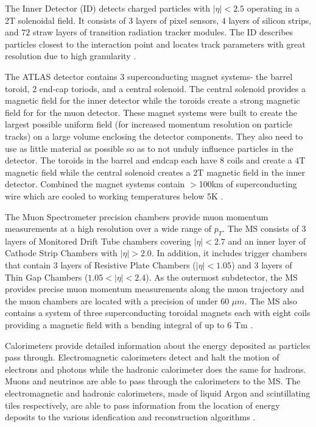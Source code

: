 The Inner Detector (ID) detects charged particles with $|\eta| < 2.5$ operating in a 2T solenoidal field. It consists of $3$ layers of pixel sensors, $4$ layers of silicon strips, and $72$ straw layers of transition radiation tracker modules. The ID describes particles closest to the interaction point and locates track parameters with great resolution due to high granularity \cite{detector}. 

The ATLAS detector contains 3 superconducting magnet systems- the barrel toroid, 2 end-cap toriods, and a central solenoid. The central solenoid provides a magnetic field for the inner detector while the toroids create a strong magnetic field for for the muon detector. These magnet systems were built to create the largest possible uniform field (for increased momentum resolution on particle tracks) on a large volume enclosing the detector components. They also need to use as little material as possible so as to not unduly influence particles in the detector. The toroids in the barrel and endcap each have 8 coils and create a 4T magnetic field while the central solenoid creates a 2T magnetic field in the inner detector. Combined the magnet systems contain $>$100km of superconducting wire which are cooled to working temperatures below 5K \cite{detector}. 

The Muon Spectrometer precision chambers provide muon momentum measurements at a high resolution over a wide range of $p_T$. The MS consists of $3$ layers of Monitored Drift Tube chambers covering $|\eta| < 2.7$ and an inner layer of Cathode Strip Chambers with $|\eta| > 2.0$. In addition, it includes trigger chambers that contain $3$ layers of Resistive Plate Chambers ($|\eta| < 1.05$) and $3$ layers of Thin Gap Chambers ($1.05 < |\eta| < 2.4$). As the outermost subdetector, the MS provides precise muon momentum measurements along the muon trajectory and the muon chambers are located with a precision of under $60$ $\mu m$. The MS also contains a system of three superconducting toroidal magnets each with eight coils providing a magnetic field with a bending integral of up to $6$ Tm \cite{detector}. 

Calorimeters provide detailed information about the energy deposited as particles pass through. Electromagnetic calorimeters detect and halt the motion of electrons and photons while the hadronic calorimeter does the same for hadrons. Muons and neutrinos are able to pass through the calorimeters to the MS. The electromagnetic and hadronic calorimeters, made of liquid Argon and scintillating tiles respectively, are able to pass information from the location of energy deposits to the various idenfication and reconstruction algorithms \cite{detector}. 

